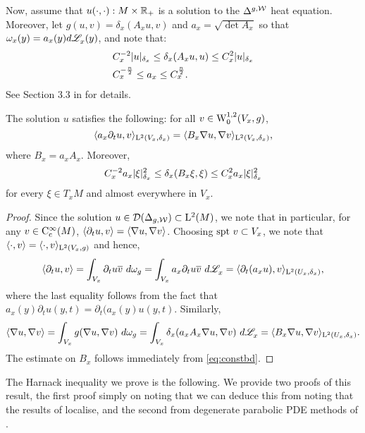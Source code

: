 \documentclass[a4paper, 12pt]{amsart}
\begin{document}
Now, assume that $u(\cdot, \cdot): M \times \R_+$ 
is a solution to the $\Delta^{g,\cW}$ heat equation.
Moreover, let $g(u,v) = \delta_x(A_x u,v)$
and $a_x = \sqrt{\det A_x}$ so that
$\omega_x(y) = a_x(y)d\Leb_x(y)$, and note
that:
\begin{equation}
\label{eq:constbd}
\begin{split}
&C_x^{-2} \modulus{u}_{\delta_x} \leq \delta_x(A_x u, u) \leq C_x^2 \modulus{u}_{\delta_x} \\
&C_x^{-\frac{n}{2}} \leq a_x \leq C_x^{\frac{n}{2}}.
\end{split}
\end{equation}
See Section 3.3 in \cite{BRough} for details. 

\begin{lemma}
\label{eq:soln1}
The solution $u$ satisfies the following: for all $v \in \SobH[0]{1}(V_x,g)$, 
	\begin{equation} 
	\label{eq:testfn1}	 
	\inprod{a_x \partial_t u, v}_{\Lp{2}(V_x, \delta_x)} 
		= \inprod{ B_x \nabla u, \nabla v}_{\Lp{2}(V_x, \delta_x)},
	\end{equation}
where $B_x = a_x A_x$. Moreover,
\begin{equation}
\label{eq:coeff}
C_x^{-2} a_x \modulus{\xi}_{\delta_x}^2 \leq \delta_x(B_x \xi, \xi) 
	\leq C_x^2 a_x \modulus{\xi}_{\delta_x}^2
\end{equation} 
for every $\xi \in T_xM$ and almost everywhere in $V_x$. 
\end{lemma}
\begin{proof}
Since the solution $u \in \dom(\Delta_{g,\cW}) \subset \Lp{2}(M)$, we
note that in particular, for any $v \in \Ck[c]{\infty}(M)$, 
$\inprod{\partial_t u, v} = \inprod{\nabla u, \nabla v}$.
Choosing $\spt v \subset V_x$, we note that $\inprod{\cdot, v} = \inprod{\cdot, v}_{\Lp{2}(V_x,g)}$
and hence,
$$\inprod{\partial_t u, v} = \int_{V_x} \partial_t u\conj{v}\ d\omega_g 
	= \int_{V_x} a_x \partial_t  u \conj{v}\ d\Leb_x
	= \inprod{\partial_t (a_x u), v}_{\Lp{2}(U_x, \delta_x)},$$
where the last equality follows from the fact that 
$a_x(y) \partial_t u(y,t) = \partial_t (a_x(y)u(y,t).$
Similarly,
$$\inprod{\nabla u, \nabla v} 
	= \int_{V_x} g(\nabla u, \nabla v)\ d\omega_g
	= \int_{V_x} \delta_x(a_x A_x \nabla u, \nabla v)\ d\Leb_x
	= \inprod{B_x \nabla u, \nabla v}_{\Lp{2}(U_x, \delta_x)}.$$
The estimate on $B_x$ follows immediately from
\eqref{eq:constbd}.
\end{proof} 

The Harnack inequality we prove is the following. We provide two proofs of this result, 
the first proof simply on noting that we can deduce this from noting that the results
of \cite{SC} localise, and the second from degenerate parabolic PDE methods of \cite{CS}.
\end{document}
